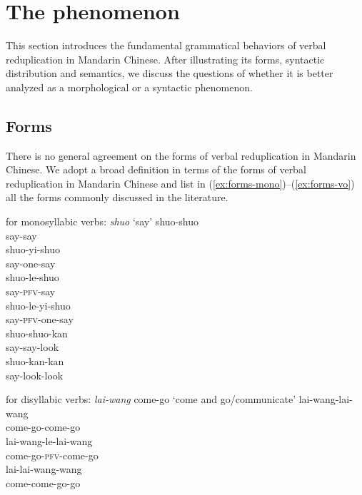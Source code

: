 \section{The phenomenon}\label{sec:phen}

This section introduces the fundamental grammatical behaviors of verbal reduplication in Mandarin Chinese.
 After illustrating its forms, syntactic distribution and semantics, 
 we discuss the questions of whether it is better analyzed as a morphological or a syntactic phenomenon.


\subsection{Forms}\label{sec:forms}

There is no general agreement on the forms of verbal reduplication in Mandarin Chinese.
We adopt a broad definition in terms of the forms of verbal reduplication in Mandarin Chinese 
and list in (\ref{ex:forms-mono})--(\ref{ex:forms-vo}) all the forms commonly discussed in the literature.

\settowidth{}

\ea\label{ex:forms-mono} for monosyllabic verbs: \textit{shuo} `say'
	\ea \gll shuo-shuo\\ 
		say-say\\ 
		\ex \gll shuo-yi-shuo\\
		say-one-say\\ 
		\ex \gll shuo-le-shuo\\
		say-\textsc{pfv}-say\\ 
		\ex \gll shuo-le-yi-shuo\\
		say-\textsc{pfv}-one-say\\ 
		\ex \gll shuo-shuo-kan\\
		say-say-look\\ 
		\ex \gll shuo-kan-kan\\
		 say-look-look\\ 
		\z

\ex\label{ex:forms-di} for disyllabic verbs: \textit{lai-wang} come-go `come and go/communicate'
		\ea \gll lai-wang-lai-wang\\
		come-go-come-go\\ 
		\ex \gll lai-wang-le-lai-wang\\
		come-go-\textsc{pfv}-come-go\\ 
		\ex \gll lai-lai-wang-wang\\
		come-come-go-go\\ 
		\z

